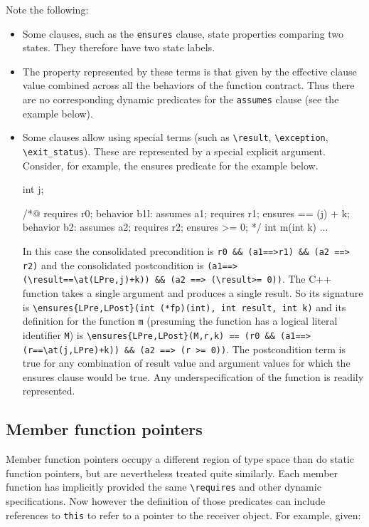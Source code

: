 Note the following:
\begin{itemize}
	\item Some clauses, such as the \lstinline|ensures| clause,
	state properties comparing two states. They therefore have two state labels.
	\item The property represented by these terms is that
	given by the effective clause value combined across all the
	behaviors of the function contract. Thus there are no
	corresponding dynamic predicates for the \lstinline|assumes| clause (see the example below).
	\item Some clauses allow using special terms (such as 
	\lstinline|\result|, 
	\lstinline|\exception|, \lstinline|\exit_status|). 
	These are represented by a special explicit argument. Consider, for example, the ensures predicate for the example below.

\begin{listing-nonumber}
int j;
		
/*@
requires r0;
behavior b1l:
  assumes a1;
  requires r1;
  ensures \result == \old(j) + k;
behavior b2:
  assumes a2;
  requires r2;
  ensures \result >= 0;
*/
int m(int k) { ... }
\end{listing-nonumber}

	In this case the consolidated precondition is
	\lstinline|r0 && (a1==>r1) && (a2 ==> r2)|
	and the consolidated postcondition is 
	\lstinline|(a1==>(\result==\at(LPre,j)+k)) && (a2 ==> (\result>= 0))|.
	The C++ function takes a single argument and produces a single result. So its signature is
	\lstinline|\ensures{LPre,LPost}(int (*fp)(int), int result, int k)|	
	and its definition for the function \lstinline|m| (presuming the function has a logical literal identifier \lstinline|M|) is
	\lstinline|\ensures{LPre,LPost}(M,r,k) == (r0 && (a1==>(r==\at(j,LPre)+k)) && (a2 ==> (r >= 0))|.
	The postcondition term is true for any combination of 
	result value and argument values for which the ensures clause would be true. Any underspecification of the function is readily represented.

\end{itemize}

\subsection{Member function pointers}
\label{sec:memberfp}
Member function pointers occupy a different region of type space than
do static function pointers, but are nevertheless treated quite
similarly. Each member function has implicitly provided the same
\lstinline|\requires| and other dynamic specifications. Now however
the definition of those predicates can include references to
\lstinline|this| to refer to a pointer to the receiver object. For
example, given:

